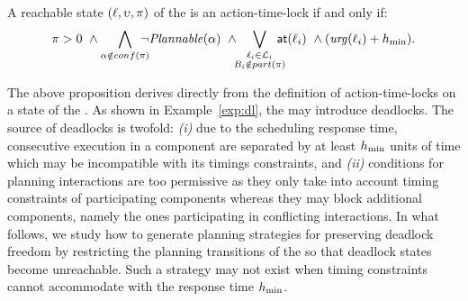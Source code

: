 
\begin{proposition}\label{prop:timelocks}
A reachable state $(\ell,\upsilon,\pi)$ of the \lps is an action-time-lock if and only if:
\begin{displaymath}
  \pi>0 \ \wedge \bigwedge_{\alpha \notin conf(\pi)} \hspace*{-2ex} \neg\plntxt{\alpha} \ \wedge
  \hspace*{-1ex} \bigvee_{\substack{\loc_i \in \Loc_i \\ B_i \notin \p{\pi}}} \hspace*{-2ex} 
  \al{\loc_i} \ \wedge (\urg(\loc_i) + \hmin).
\end{displaymath}
\end{proposition}
The above proposition derives directly from the definition of action-time-locks on a state 
of the \lpsb. 
As shown in Example~\ref{exp:dl}, the \lps may introduce deadlocks.
The source of deadlocks is twofold: \emph{(i)} due to the scheduling response time, 
consecutive execution in a component are separated by at least $h_{\min}$ units of time which may 
be incompatible with its timings constraints, and \emph{(ii)} conditions for planning 
interactions are too permissive as they only take into account timing constraints of 
participating components whereas they may block additional components, namely the ones 
participating in conflicting interactions.
In what follows, we study how to generate planning strategies for preserving 
deadlock freedom by restricting the planning transitions of the \lpsabrb so that deadlock 
states become unreachable.
Such a strategy may not exist when timing constraints cannot accommodate with the 
response time $h_{\min}$.

